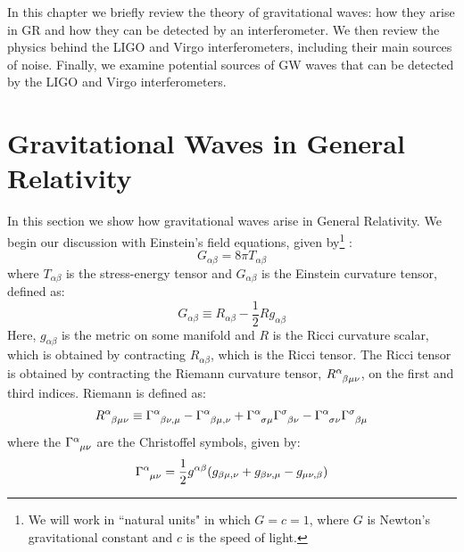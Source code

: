\def\qI{\ensuremath{\mathcal{I}}}
\def\TT{\ensuremath{\mathrm{TT}}}
\def\fGW{\ensuremath{f_{\mathrm{GW}}}}

In this chapter we briefly review the theory of gravitational waves: how they arise in \ac{GR} and how they can be detected by an interferometer. We then review the physics behind the \ac{LIGO} and Virgo interferometers, including their main sources of noise. Finally, we examine potential sources of \ac{GW} waves that can be detected by the \ac{LIGO} and Virgo interferometers.

\section{Gravitational Waves in General Relativity}
\label{sec:gr}

In this section we show how gravitational waves arise in General Relativity. We begin our discussion with Einstein's field equations, given by\footnote{We will work in ``natural units" in which $G = c = 1$, where $G$ is Newton's gravitational constant and $c$ is the speed of light.} \cite{MTW}:
\begin{equation}
\label{eqn:einstein_field_eqns}
G_{\alpha\beta} = 8\pi T_{\alpha \beta}
\end{equation}
where $T_{\alpha\beta}$ is the stress-energy tensor and $G_{\alpha\beta}$ is the Einstein curvature tensor, defined as:
\begin{equation}
G_{\alpha\beta} \equiv R_{\alpha \beta} - \frac{1}{2}R g_{\alpha\beta}
\end{equation}
Here, $g_{\alpha\beta}$ is the metric on some manifold and $R$ is the Ricci curvature scalar, which is obtained by contracting $R_{\alpha\beta}$, which is the Ricci tensor. The Ricci tensor is obtained by contracting the Riemann curvature tensor, $R\indices{^\alpha_{\beta\mu\nu}}$, on the first and third indices. Riemann is defined as:
\begin{equation}
R\indices{^\alpha_{\beta\mu\nu}} \equiv \Gamma\indices{^\alpha_{\beta\nu,\mu}} - \Gamma\indices{^\alpha_{\beta\mu,\nu}} + \Gamma\indices{^\alpha_{\sigma\mu}}\Gamma\indices{^\sigma_{\beta\nu}} - \Gamma\indices{^\alpha_{\sigma\nu}}\Gamma\indices{^\sigma_{\beta\mu}}
\end{equation}
where the $\Gamma\indices{^\alpha_{\mu\nu}}$ are the Christoffel symbols, given by:
\begin{equation}
\Gamma\indices{^\alpha_{\mu\nu}} = \frac{1}{2}g^{\alpha\beta}(g_{\beta\mu,\nu} + g_{\beta\nu,\mu} - g_{\mu\nu,\beta})
\end{equation}
